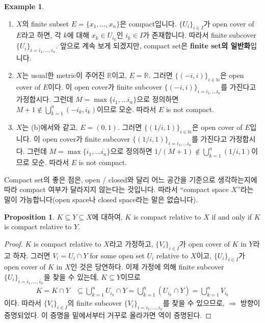 \documentclass[12pt]{article}
\theoremstyle{definition}
\newtheorem{prop}[thm]{Proposition}
\newtheorem*{ex}{Example}
\def\NN{\mathbb{N}}
\def\RR{\mathbb{R}}
\begin{document}
	\begin{ex}
		\quad
		\begin{enumerate}[label=(\alph*), leftmargin=2\parindent]
			\item
			\(X\)의 finite subset \(E=\{x_1, \ldots, x_n\}\)은 compact입니다. \(\{U_i\}_{i \in I}\)가 open cover of \(E\)라고 하면, 각 \(k\)에 대해 \(x_k \in U_{i_k}\)인 \(i_k \in I\)가 존재합니다. 따라서 finite subcover \(\{U_i\}_{i=i_1, \ldots, i_n}\). 앞으로 계속 보게 되겠지만, compact set은 \textbf{finite set의 일반화}입니다.
			\item
			\(X\)는 usual한 metric이 주어진 \(\RR\)이고, \(E = \RR\). 그러면 \(\{(-i, i)\}_{i \in \NN}\)은 open cover of \(E\)이다. 이 open cover가 finite subcover \(\{(-i, i)\}_{i = i_1, \ldots i_n}\)를 가진다고 가정합시다. 그런데 \(M = \max \{i_1, \ldots i_n\}\)으로 정의하면 \(M+1 \notin \bigcup_{k=1}^n (-i_k, i_k)\)이므로 모순. 따라서 \(E\) is not compact.
			\item
			\(X\)는 (b)에서와 같고, \(E = (0, 1)\). 그러면 \(\{(1/i, 1)\}_{i \in \NN}\)은 open cover of \(E\)입니다. 이 open cover가 finite subcover \(\{(1/i, 1)\}_{i = i_1, \ldots i_n}\)를 가진다고 가정합시다. 그런데 \(M = \max \{i_1, \ldots i_n\}\)으로 정의하면 \(1/(M+1) \notin \bigcup_{k=1}^n (1/i, 1)\)이므로 모순. 따라서 \(E\) is not compact.
		\end{enumerate}	
	\end{ex}

Compact set의 좋은 점은, open / closed와 달리 어느 공간을 기준으로 생각하는지에 따라 compact 여부가 달라지지 않는다는 것입니다. 따라서 ``compact space \(X\)''라는 말이 가능합니다(open space나 closed space라는 말은 없습니다).

	\begin{prop}
		\(K \subseteq Y \subseteq X\)에 대하여, \(K\) is compact relative to  \(X\) if and only if \(K\) is compact relative to \(Y\).
	\end{prop}
	\begin{proof}
		\(K\) is compact relative to \(X\)라고 가정하고, \(\{V_i\}_{i \in I}\)가 open cover of \(K\) in \(Y\)라고 하자. 그러면 \(V_i = U_i \cap Y\) for some open set \(U_i\) relative to \(X\)이고, \(\{U_i\}_{i \in I}\)가 open cover of \(K\) in \(X\)인 것은 당연하다. 이제 가정에 의해 finite subcover \(\{U_i\}_{i=i_1, \ldots, i_n}\)을 찾을 수 있는데, \(K \subseteq Y\)이므로
		\begin{align*}
			K = K \cap Y &\subseteq \bigcup_{k=1}^n U_{i_k} \cap Y = \bigcup_{k=1}^n (U_{i_k} \cap Y) = \bigcup_{k=1}^n V_{i_k}
		\end{align*}
		이다. 따라서 \(\{V_i\}_{i \in I}\)의 finite subcover \(\{V_i\}_{i=i_1, \ldots, i_n}\)를 찾을 수 있으므로, \(\Rightarrow\) 방향이 증명되었다. 이 증명을 밑에서부터 거꾸로 올라가면 역이 증명된다.
	\end{proof}
\end{document}
